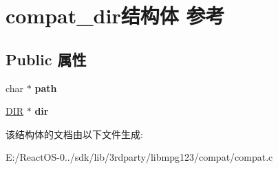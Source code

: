 \hypertarget{structcompat__dir}{}\section{compat\+\_\+dir结构体 参考}
\label{structcompat__dir}
\subsection*{Public 属性}
\begin{DoxyCompactItemize}
\item 
\mbox{\label{structcompat__dir_aa8389e6575d64f78ef904ae0ad82e5c1}} 
char $\ast$ {\bfseries path}
\item 
\mbox{\label{structcompat__dir_aa0f44560e24feaec2ed5ffe06b837ae7}} 
\hyperlink{struct_d_i_r}{D\+IR} $\ast$ {\bfseries dir}
\end{DoxyCompactItemize}


该结构体的文档由以下文件生成\+:\begin{DoxyCompactItemize}
\item 
E\+:/\+React\+O\+S-\/0../sdk/lib/3rdparty/libmpg123/compat/compat.\+c\end{DoxyCompactItemize}
